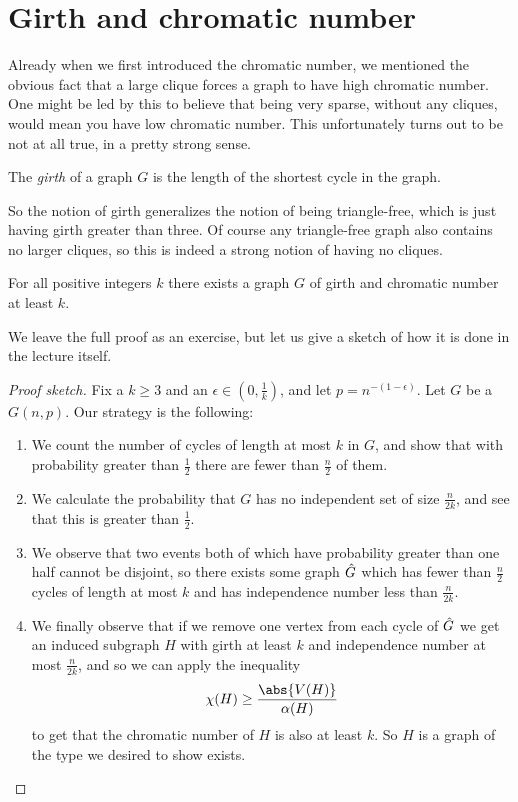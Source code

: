 \documentclass[nobib]{tufte-handout}
\begin{document}
\section{Girth and chromatic number}

Already when we first introduced the chromatic number, we mentioned the obvious fact that a large clique forces a graph to have high chromatic number. One might be led by this to believe that being very sparse, without any cliques, would mean you have low chromatic number. This unfortunately turns out to be not at all true, in a pretty strong sense.

\begin{definition}
  The \emph{girth} of a graph $G$ is the length of the shortest cycle in the graph.
\end{definition}

So the notion of girth generalizes the notion of being triangle-free, which is just having girth greater than three. Of course any triangle-free graph also contains no larger cliques, so this is indeed a strong notion of having no cliques.

\begin{theorem}[Erd\H{o}s, 1959]\label{thm:high_girth_high_chromatic_number}
  For all positive integers $k$ there exists a graph $G$ of girth and chromatic number at least $k$.
\end{theorem}

We leave the full proof as an exercise, but let us give a sketch of how it is done in the lecture itself.

\begin{proof}[Proof sketch]
  Fix a $k \geq 3$ and an $\epsilon \in \left(0, \frac{1}{k}\right)$, and let $p = n^{-(1-\epsilon)}$. Let $G$ be a $G(n,p)$. Our strategy is the following:
  \begin{enumerate}
    \item We count the number of cycles of length at most $k$ in $G$, and show that with probability greater than $\frac{1}{2}$ there are fewer than $\frac{n}{2}$ of them.
    \item We calculate the probability that $G$ has no independent set of size $\frac{n}{2k}$, and see that this is greater than $\frac{1}{2}$.
    \item We observe that two events both of which have probability greater than one half cannot be disjoint, so there exists some graph $\Hat G$ which has fewer than $\frac{n}{2}$ cycles of length at most $k$ and has independence number less than $\frac{n}{2k}$.
    \item We finally observe that if we remove one vertex from each cycle of $\Hat G$ we get an induced subgraph $H$ with girth at least $k$ and independence number at most $\frac{n}{2k}$, and so we can apply the inequality
    $$\chi(H) \geq \frac{\abs{V(H)}}{\alpha(H)}$$
    to get that the chromatic number of $H$ is also at least $k$. So $H$ is a graph of the type we desired to show exists.
  \end{enumerate}
\end{proof}
\end{document}
